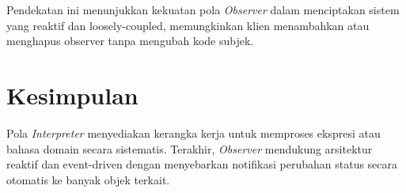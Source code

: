 Pendekatan ini menunjukkan kekuatan pola \textit{Observer} dalam menciptakan sistem yang reaktif dan loosely-coupled, memungkinkan klien menambahkan atau menghapus observer tanpa mengubah kode subjek.

\section{Kesimpulan}
Pola \textit{Interpreter} menyediakan kerangka kerja untuk memproses ekspresi atau bahasa domain secara sistematis. Terakhir, \textit{Observer} mendukung arsitektur reaktif dan event-driven dengan menyebarkan notifikasi perubahan status secara otomatis ke banyak objek terkait.